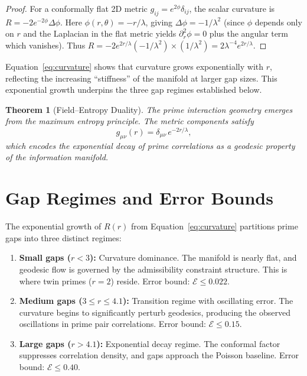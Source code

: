 \documentclass[12pt]{article}
\newtheorem{theorem}{Theorem}[section]
\begin{document}
\begin{proof}
For a conformally flat 2D metric $g_{ij} = e^{2\phi} \delta_{ij}$, the scalar
curvature is $R = -2 e^{-2\phi} \Delta \phi$. Here
$\phi(r,\theta) = -r/\lambda$, giving $\Delta \phi = -1/\lambda^2$ (since
$\phi$ depends only on $r$ and the Laplacian in the flat metric yields
$\partial_r^2 \phi = 0$ plus the angular term which vanishes). Thus
$R = -2 e^{2r/\lambda}(-1/\lambda^2) \times (1/\lambda^2) = 2\lambda^{-4} e^{2r/\lambda}$.
\end{proof}

Equation~\eqref{eq:curvature} shows that curvature grows exponentially with $r$,
reflecting the increasing ``stiffness'' of the manifold at larger gap sizes.
This exponential growth underpins the three gap regimes established below.

\begin{theorem}[Field--Entropy Duality]
The prime interaction geometry emerges from the maximum entropy principle.
The metric components satisfy
\begin{equation}
  g_{\mu\nu}(r) = \delta_{\mu\nu}\, e^{-2r/\lambda},
  \label{eq:field_entropy}
\end{equation}
which encodes the exponential decay of prime correlations as a geodesic
property of the information manifold.
\end{theorem}
\label{thm:field_entropy}

\section{Gap Regimes and Error Bounds}

The exponential growth of $R(r)$ from Equation~\eqref{eq:curvature} partitions
prime gaps into three distinct regimes:

\begin{enumerate}
  \item \textbf{Small gaps ($r < 3$):} Curvature dominance. The manifold is nearly
    flat, and geodesic flow is governed by the admissibility constraint structure.
    This is where twin primes ($r=2$) reside. Error bound: $\mathcal{E} \leq 0.022$.

  \item \textbf{Medium gaps ($3 \leq r \leq 4.1$):} Transition regime with oscillating
    error. The curvature begins to significantly perturb geodesics, producing
    the observed oscillations in prime pair correlations.
    Error bound: $\mathcal{E} \leq 0.15$.

  \item \textbf{Large gaps ($r > 4.1$):} Exponential decay regime. The conformal
    factor suppresses correlation density, and gaps approach the Poisson baseline.
    Error bound: $\mathcal{E} \leq 0.40$.
\end{enumerate}
\end{document}
